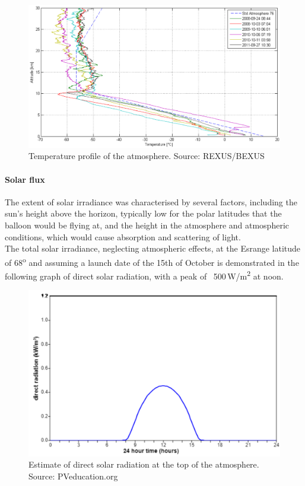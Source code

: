 	\begin{figure}[H]
    \centering
    \includegraphics[scale=0.58]{4-experiment-design/img/mechanical/atmosphere.PNG}
	\caption{Temperature profile of the atmosphere. Source: REXUS/BEXUS}
	\label{fig:atmosphere}
	\end{figure}



\paragraph{Solar flux}

The extent of solar irradiance was characterised by several factors, including the sun’s height above the horizon, typically low for the polar latitudes that the balloon would be flying at, and the height in the atmosphere and atmospheric conditions, which would cause absorption and scattering of light. \\
The total solar irradiance, neglecting atmospheric effects, at the Esrange latitude of 68\textsuperscript{o} and assuming a launch date of the 15th of October is demonstrated in the following graph of direct solar radiation, with a peak of ~500\,W/m\textsuperscript{2} at noon.\\

	\begin{figure}[H]
    \centering
    \includegraphics[scale=0.6]{4-experiment-design/img/mechanical/directradiation.png}
	\caption{Estimate of direct solar radiation at the top of the atmosphere. Source: PVeducation.org}
	\label{fig:directradiation}
	\end{figure}

